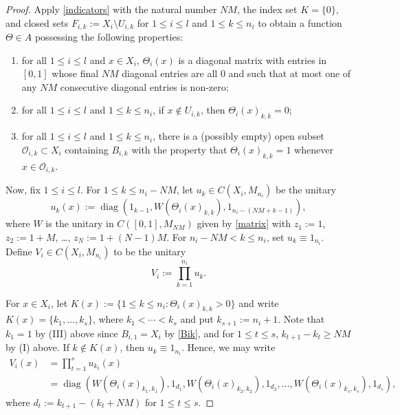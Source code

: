 \documentclass[12pt]{amsart}
\numberwithin{equation}{section}
\theoremstyle{definition}
\theoremstyle{remark}
\newcommand{\diag}{\operatorname{diag}}
\begin{document}
\begin{proof}
	
	
	
	Apply \autoref{indicators} with the natural number $NM$, the index set $K=\{0\}$, and closed sets $F_{i,k}:=X_{i}\setminus U_{i,k}$ for $1\leq i\leq  l $ and $1\leq k\leq n_{i}$ to obtain a function $\Theta\in A$ possessing the following properties:
	\begin{enumerate}[label=(\Roman*)]
		\item for all $1\leq i\leq  l $ and $x\in X_{i}$, $\Theta_{i}(x)$ is a diagonal matrix with entries in $[0,1]$ whose final $NM$ diagonal entries are all $0$ and such that at most one of any $NM$ consecutive diagonal entries is non-zero;
		\item for all $1\leq i\leq  l $ and $1\leq k\leq n_{i}$, if $x\notin U_{i,k}$, then $\Theta_{i}(x)_{k,k}=0$;
		\item for all $1\leq i\leq  l $ and $1\leq k\leq n_{i}$, there is a (possibly empty) open subset $\mathcal{O}_{i,k}\subset X_{i}$ containing $B_{i,k}$ with the property that $\Theta_{i}(x)_{k,k}=1$ whenever $x\in\mathcal{O}_{i,k}$.
	\end{enumerate}
	
	Now, fix $1\leq i\leq l $. For $1\leq k\leq n_{i}-NM$, let $u_{k}\in C(X_{i},M_{n_{i}})$ be the unitary
	$$
	u_{k}(x):=\diag(1_{k-1}, W(\Theta_{i}(x)_{k,k}),1_{n_{i}-(NM+k-1)}),
	$$
	where $W$ is the unitary in $C([0,1],M_{NM})$ given by \autoref{matrix} with $z_{1}:=1$, $z_{2}:=1+M$, \ldots, $z_{N}:=1+(N-1)M$. For $n_{i}-NM<k\leq n_{i}$, set $u_{k}\equiv1_{n_{i}}$. Define $V_{i}\in C(X_{i},M_{n_{i}})$ to be the unitary
	$$
	V_{i}:=\prod_{k=1}^{n_{i}}u_{k}.
	$$
	
	For $x\in X_{i}$, let $K(x):=\{1\leq k\leq n_{i}:\Theta_{i}(x)_{k,k}>0\}$ and write $K(x)=\{k_{1},\ldots,k_{s}\}$, where $k_{1}<\cdots<k_{s}$ and put $k_{s+1}:=n_{i}+1$. Note that $k_{1}=1$ by (III) above since $B_{i,1}=X_{i}$ by \autoref{Bik}, and for $1\leq t\leq s$, $k_{t+1}-k_{t}\geq NM$ by (I) above. If $k\notin K(x)$, then $u_{k}\equiv 1_{n_{i}}$. Hence, we may write
	\begin{equation}
	\label{Vi}
	\begin{aligned}
	V_{i}(x)&=\prod_{t=1}^{s}u_{k_{t}}(x)\\
	&=\diag\left(W(\Theta_{i}(x)_{k_{1},k_{1}}),1_{d_{1}},W(\Theta_{i}(x)_{k_{2},k_{2}}),1_{d_{2}},\ldots,W(\Theta_{i}(x)_{k_{s},k_{s}}),1_{d_{s}}\right),
	\end{aligned}
	\end{equation}
	where $d_{t}:=k_{t+1}-(k_{t}+NM)$ for $1\leq t\leq s$. 
	

\end{proof}
\end{document}
